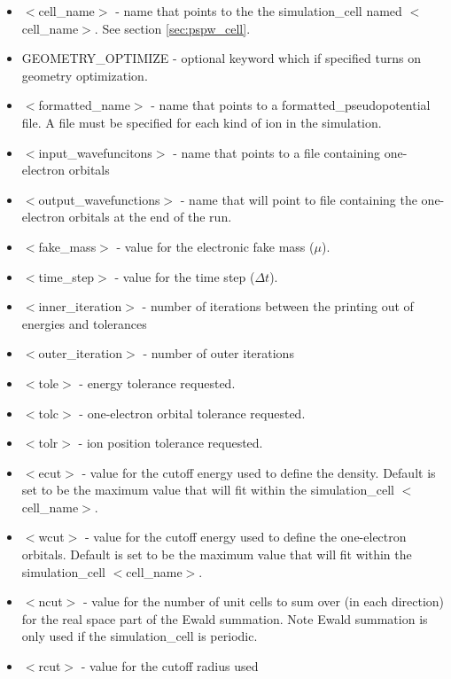 \begin{itemize}
	\item $<$cell\_name$>$ - name that points to the
              the simulation\_cell named $<$cell\_name$>$. See section \ref{sec:pspw_cell}.
	\item GEOMETRY\_OPTIMIZE - optional keyword which if specified
	      turns on geometry optimization. 	
	\item $<$formatted\_name$>$ - name that points
              to a formatted\_pseudopotential file.  A file must
              be specified for each kind of ion in the simulation.
	\item $<$input\_wavefuncitons$>$ - name that points
              to a file containing one-electron orbitals
	\item $<$output\_wavefunctions$>$ - name that will
              point to file containing the one-electron orbitals at the
              end of the run. 
	\item $<$fake\_mass$>$ - value for the electronic
              fake mass ($\mu$).
	\item $<$time\_step$>$ - value for the time step ($\Delta t$).
	\item $<$inner\_iteration$>$ - number of iterations between the 
              printing out of energies and tolerances
	\item $<$outer\_iteration$>$ - number of outer iterations
 	\item $<$tole$>$ - energy tolerance requested.
	\item $<$tolc$>$ - one-electron orbital tolerance requested.
	\item $<$tolr$>$ - ion position tolerance requested.
	\item $<$ecut$>$ - value for the cutoff energy used
                           to define the density.  Default is set
                           to be the maximum value that will fit
                           within the simulation\_cell $<$cell\_name$>$.
	\item $<$wcut$>$ - value for the cutoff energy used
 			   to define the one-electron orbitals. Default is set
                           to be the maximum value that will fit
                           within the simulation\_cell $<$cell\_name$>$.
	\item $<$ncut$>$ - value for the number of unit cells
 			  to sum over (in each direction) for the real space
			  part of the Ewald summation.  Note Ewald summation
                          is only used if the simulation\_cell is periodic.
	\item $<$rcut$>$ - value for the cutoff radius used

\end{itemize}
